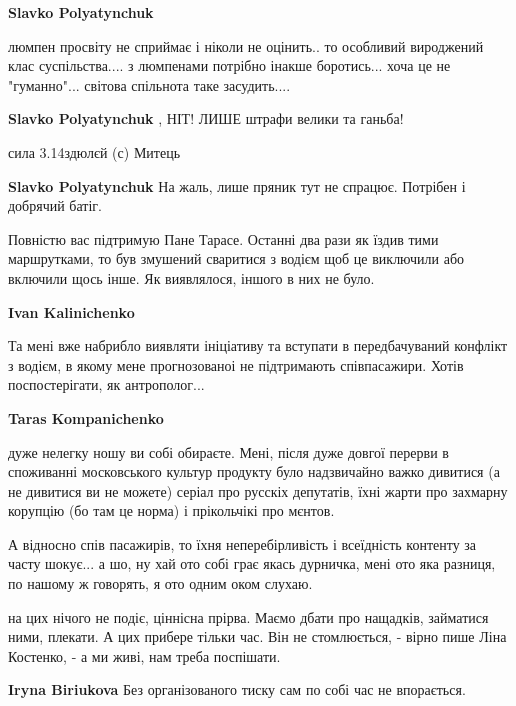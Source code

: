 \begin{itemize}
\begin{itemize} %
\textbf{Slavko Polyatynchuk} 

люмпен просвіту не сприймає і ніколи не оцінить.. то особливий вироджений клас
суспільства.... з люмпенами потрібно інакше боротись... хоча це не
"гуманно"... світова спільнота таке засудить....


\textbf{Slavko Polyatynchuk} , НІТ!
ЛИШЕ штрафи велики та ганьба!

сила 3.14здюлєй (с) Митець

\textbf{Slavko Polyatynchuk} На жаль, лише пряник тут не спрацює. Потрібен і добрячий батіг.
\end{itemize} %


Повністю вас підтримую Пане Тарасе. Останні два рази як їздив тими маршрутками,
то був змушений сваритися з водієм щоб це виключили або включили щось інше. Як
виявлялося, іншого в них не було.

\begin{itemize} %
\textbf{Ivan Kalinichenko} 

Та мені вже набрибло виявляти ініціативу та вступати в передбачуваний конфлікт
з водієм, в якому мене прогнозованоі не підтримають співпасажири. Хотів
поспостерігати, як антрополог...


\textbf{Taras Kompanichenko} 

дуже нелегку ношу ви собі обираєте. Мені, після дуже довгої перерви в
споживанні московського культур продукту було надзвичайно важко дивитися (а не
дивитися ви не можете) серіал про русскіх депутатів, їхні жарти про захмарну
корупцію (бо там це норма) і прікольчікі про мєнтов.

А відносно спів пасажирів, то їхня неперебірливість і всеїдність контенту за
часту шокує... а шо, ну хай ото собі грає якась дурничка, мені ото яка разниця,
по нашому ж говорять, я ото одним оком слухаю.

\end{itemize} %


на цих нічого не подіє, ціннісна прірва. Маємо дбати про нащадків, займатися
ними, плекати. А цих прибере тільки час. Він не стомлюється, - вірно пише Ліна
Костенко, - а ми живі, нам треба поспішати.

\begin{itemize} %
\textbf{Iryna Biriukova} Без організованого тиску сам по собі час не впорається.


\end{itemize}
\end{itemize}
